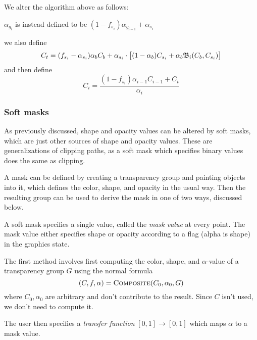 We alter the algorithm above as follows:
\blist
    \item $\alpha_{g_i}$ is instead defined to be $(1-f_{s_i})\alpha_{g_{i-1}}+\alpha_{s_i}$
    \item we also define 
    $$ C_t=(f_{s_i}-\alpha_{s_i})\alpha_bC_b + \alpha_{s_i}\cdot\bigl[(1-\alpha_b)C_{s_i}+
    \alpha_b{\frak B}_i(C_b,C_{s_i})\bigr] $$
    and then define
    $$ C_i = \frac{(1-f_{s_i})\alpha_{i-1}C_{i-1}+C_t}{\alpha_i} $$
\elist

\subsubsection{Soft masks}

As previously discussed, shape and opacity values can be altered by soft masks, which are just other sources
of shape and opacity values.
These are generalizations of clipping paths, as a soft mask which specifies binary values does the same as
clipping.

A mask can be defined by creating a transparency group and painting objects into it, which defines the color,
shape, and opacity in the usual way.
Then the resulting group can be used to derive the mask in one of two ways, discussed below.

A soft mask specifies a single value, called the {\it mask value} at every point.
The mask value either specifies shape or opacity according to a flag (alpha is shape) in the graphics state.


The first method involves first computing the color, shape, and $\alpha$-value of a transparency group $G$
using the normal formula
$$ (C,f,\alpha) = \hbox{\sc Composite}(C_0,\alpha_0,G) $$
where $C_0,\alpha_0$ are arbitrary and don't contribute to the result.
Since $C$ isn't used, we don't need to compute it.

The user then specifies a {\it transfer function} $[0,1]\to[0,1]$ which maps $\alpha$ to a mask value.


